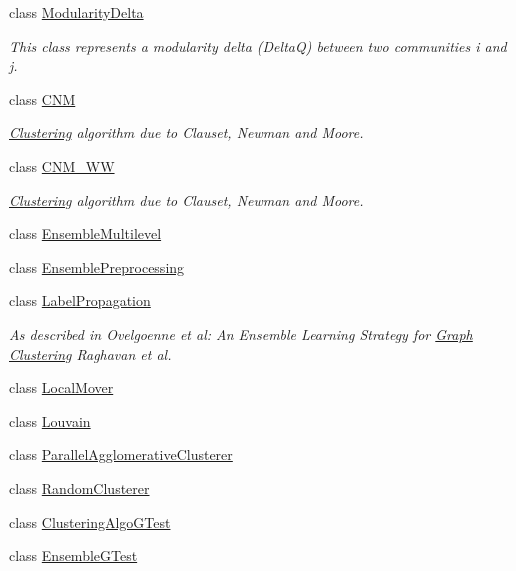 \begin{DoxyCompactItemize}
class \hyperlink{class_networ_kit_1_1_modularity_delta}{Modularity\-Delta}
\begin{DoxyCompactList}\small\item\em This class represents a modularity delta (Delta\-Q) between two communities i and j. \end{DoxyCompactList}\item 
class \hyperlink{class_networ_kit_1_1_c_n_m}{C\-N\-M}
\begin{DoxyCompactList}\small\item\em \hyperlink{class_networ_kit_1_1_clustering}{Clustering} algorithm due to Clauset, Newman and Moore. \end{DoxyCompactList}\item 
class \hyperlink{class_networ_kit_1_1_c_n_m___w_w}{C\-N\-M\-\_\-\-W\-W}
\begin{DoxyCompactList}\small\item\em \hyperlink{class_networ_kit_1_1_clustering}{Clustering} algorithm due to Clauset, Newman and Moore. \end{DoxyCompactList}\item 
class \hyperlink{class_networ_kit_1_1_ensemble_multilevel}{Ensemble\-Multilevel}
\item 
class \hyperlink{class_networ_kit_1_1_ensemble_preprocessing}{Ensemble\-Preprocessing}
\item 
class \hyperlink{class_networ_kit_1_1_label_propagation}{Label\-Propagation}
\begin{DoxyCompactList}\small\item\em As described in Ovelgoenne et al\-: An Ensemble Learning Strategy for \hyperlink{class_networ_kit_1_1_graph}{Graph} \hyperlink{class_networ_kit_1_1_clustering}{Clustering} Raghavan et al. \end{DoxyCompactList}\item 
class \hyperlink{class_networ_kit_1_1_local_mover}{Local\-Mover}
\item 
class \hyperlink{class_networ_kit_1_1_louvain}{Louvain}
\item 
class \hyperlink{class_networ_kit_1_1_parallel_agglomerative_clusterer}{Parallel\-Agglomerative\-Clusterer}
\item 
class \hyperlink{class_networ_kit_1_1_random_clusterer}{Random\-Clusterer}
\item 
class \hyperlink{class_networ_kit_1_1_clustering_algo_g_test}{Clustering\-Algo\-G\-Test}
\item 
class \hyperlink{class_networ_kit_1_1_ensemble_g_test}{Ensemble\-G\-Test}

\end{DoxyCompactItemize}
